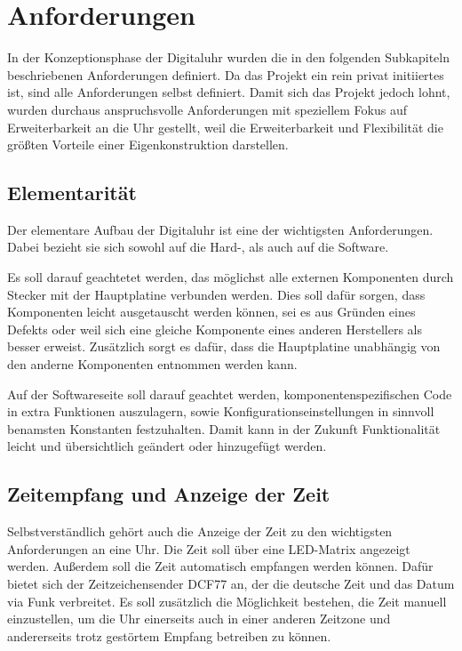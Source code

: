\section{Anforderungen}
In der Konzeptionsphase der Digitaluhr wurden die in den folgenden Subkapiteln beschriebenen Anforderungen definiert.
Da das Projekt ein rein privat initiiertes ist, sind alle Anforderungen selbst definiert. Damit sich das Projekt jedoch
lohnt, wurden durchaus anspruchsvolle Anforderungen mit speziellem Fokus auf Erweiterbarkeit an die Uhr gestellt, weil die
Erweiterbarkeit und Flexibilität die größten Vorteile einer Eigenkonstruktion darstellen.
%
\subsection{Elementarität}
Der elementare Aufbau der Digitaluhr ist eine der wichtigsten Anforderungen. Dabei bezieht sie sich sowohl auf die Hard-,
als auch auf die Software.

Es soll darauf geachtetet werden, das möglichst alle externen Komponenten durch Stecker mit der Hauptplatine verbunden werden. 
Dies soll dafür sorgen, dass Komponenten leicht ausgetauscht werden können, sei es aus Gründen eines Defekts oder weil sich eine 
gleiche Komponente eines anderen Herstellers als besser erweist. Zusätzlich sorgt es dafür, dass die Hauptplatine unabhängig
von den anderne Komponenten entnommen werden kann.

Auf der Softwareseite soll darauf geachtet werden, komponentenspezifischen Code in extra Funktionen auszulagern, sowie
Konfigurationseinstellungen in sinnvoll benamsten Konstanten festzuhalten. Damit kann in der Zukunft Funktionalität leicht und
übersichtlich geändert oder hinzugefügt werden.
%
\subsection{Zeitempfang und Anzeige der Zeit}
Selbstverständlich gehört auch die Anzeige der Zeit zu den wichtigsten Anforderungen an eine Uhr. Die Zeit soll über eine
LED-Matrix angezeigt werden. Außerdem soll die Zeit automatisch empfangen werden können. Dafür bietet sich der 
Zeitzeichensender DCF77 an, der die deutsche Zeit und das Datum via Funk verbreitet. Es soll zusätzlich die Möglichkeit
bestehen, die Zeit manuell einzustellen, um die Uhr einerseits auch in einer anderen Zeitzone und
andererseits trotz gestörtem Empfang betreiben zu können.

